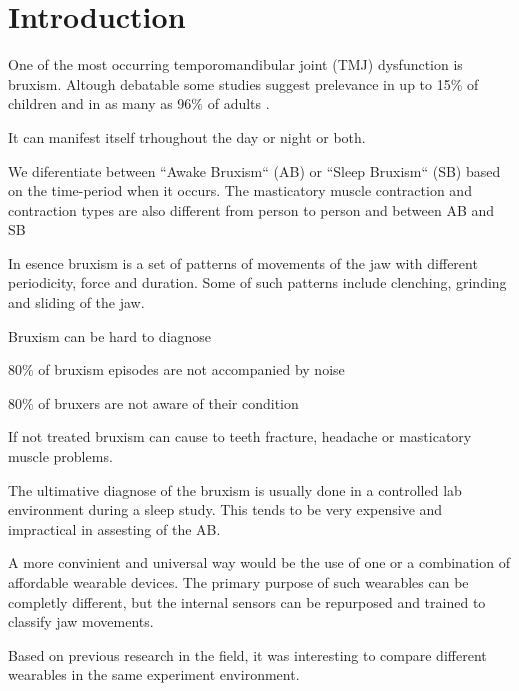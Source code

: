 \chapter{Introduction}
\label{ch:Introduction}

One of the most occurring temporomandibular joint (TMJ) dysfunction is bruxism. Altough debatable some studies suggest prelevance in up to 15\% of children and in as many as 96\% of adults \cite{thompson1994treatment}.

It can manifest itself trhoughout the day or night or both. 

We diferentiate between ``Awake Bruxism`` (AB) or ``Sleep Bruxism`` (SB) based on the time-period when it occurs. The masticatory muscle contraction and contraction types are also different from person to person and between AB and SB

In esence bruxism is a set of patterns of movements of the jaw with different periodicity, force and duration. Some of such patterns include clenching, grinding and sliding of the jaw.

Bruxism can be hard to diagnose

80\% of bruxism episodes are not accompanied by noise \cite{shetty2010bruxism}

80\% of bruxers are not aware of their condition \cite{thompson1994treatment}

If not treated bruxism can cause to teeth fracture, headache or masticatory muscle problems.

The ultimative diagnose of the bruxism is usually done in a controlled lab environment during a sleep study. This tends to be very expensive and impractical in assesting of the AB.

A more convinient and universal way would be the use of one or a combination of affordable wearable devices. The primary purpose of such wearables can be completly different, but the internal sensors can be repurposed and trained to classify jaw movements.

Based on previous research in the field, it was interesting to compare different wearables in the same experiment environment.